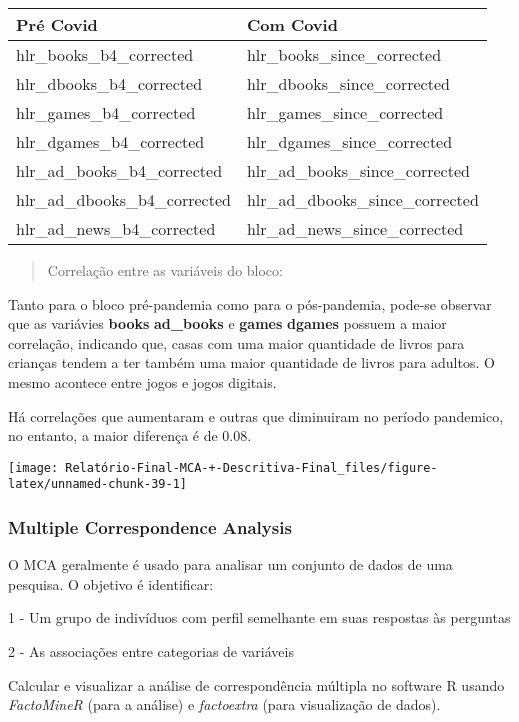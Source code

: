 \documentclass[
]{article}
\begin{document}
\begin{longtable}[]{@{}ll@{}}
\toprule
Pré Covid & Com Covid\tabularnewline
\midrule
\endhead
hlr\_books\_b4\_corrected & hlr\_books\_since\_corrected\tabularnewline
hlr\_dbooks\_b4\_corrected &
hlr\_dbooks\_since\_corrected\tabularnewline
hlr\_games\_b4\_corrected & hlr\_games\_since\_corrected\tabularnewline
hlr\_dgames\_b4\_corrected &
hlr\_dgames\_since\_corrected\tabularnewline
hlr\_ad\_books\_b4\_corrected &
hlr\_ad\_books\_since\_corrected\tabularnewline
hlr\_ad\_dbooks\_b4\_corrected &
hlr\_ad\_dbooks\_since\_corrected\tabularnewline
hlr\_ad\_news\_b4\_corrected &
hlr\_ad\_news\_since\_corrected\tabularnewline
\bottomrule
\end{longtable}

\begin{quote}
Correlação entre as variáveis do bloco:
\end{quote}

Tanto para o bloco pré-pandemia como para o pós-pandemia, pode-se
observar que as variávies \textbf{books} \textbar{} \textbf{ad\_books} e
\textbf{games} \textbar{} \textbf{dgames} possuem a maior correlação,
indicando que, casas com uma maior quantidade de livros para crianças
tendem a ter também uma maior quantidade de livros para adultos. O mesmo
acontece entre jogos e jogos digitais.

Há correlações que aumentaram e outras que diminuiram no período
pandemico, no entanto, a maior diferença é de 0.08.

\begin{center}\texttt{[image: Relatório-Final-MCA-+-Descritiva-Final\_files/figure-latex/unnamed-chunk-39-1]} \end{center}

\hypertarget{multiple-correspondence-analysis-1}{%
\subsubsection{\texorpdfstring{\textbf{Multiple Correspondence
Analysis}}{Multiple Correspondence Analysis}}\label{multiple-correspondence-analysis-1}}

O MCA geralmente é usado para analisar um conjunto de dados de uma
pesquisa. O objetivo é identificar:

1 - Um grupo de indivíduos com perfil semelhante em suas respostas às
perguntas

2 - As associações entre categorias de variáveis

Calcular e visualizar a análise de correspondência múltipla no software
R usando \emph{FactoMineR} (para a análise) e \emph{factoextra} (para
visualização de dados).
\end{document}
